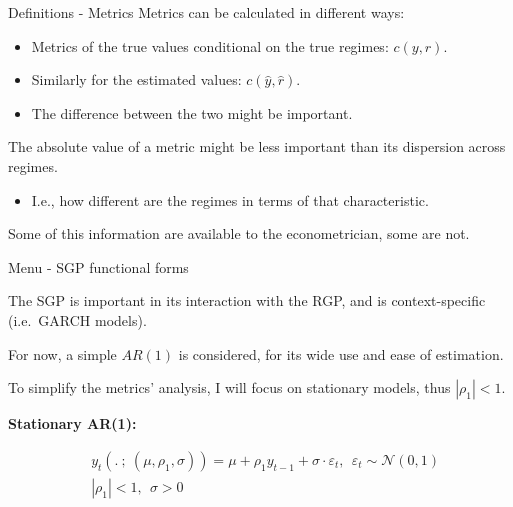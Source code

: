 \documentclass[
  ignorenonframetext,
]{beamer}
\providecommand{\tightlist}{%
  \setlength{\itemsep}{0pt}\setlength{\parskip}{0pt}}\usepackage{longtable,booktabs,array}
\begin{document}
\begin{frame}{Definitions - Metrics}
\label{definitions---metrics-1}
Metrics can be calculated in different ways:

\begin{itemize}
\tightlist
\item
  Metrics of the true values conditional on the true regimes:
  \(c(y, r)\).
\item
  Similarly for the estimated values: \(c(\hat{y}, \hat{r})\).
\item
  The difference between the two might be important.
\end{itemize}

The absolute value of a metric might be less important than its
dispersion across regimes.

\begin{itemize}
\tightlist
\item
  I.e., how different are the regimes in terms of that characteristic.
\end{itemize}

Some of this information are available to the econometrician, some are
not.
\end{frame}

\begin{frame}{Menu - SGP functional forms}
\label{menu---sgp-functional-forms}

The SGP is important in its interaction with the RGP, and is
context-specific (i.e.~GARCH models).

For now, a simple \(AR(1)\) is considered, for its wide use and ease of
estimation.

To simplify the metrics' analysis, I will focus on stationary models,
thus \(|\rho_1| < 1\).

\textbf{Stationary AR(1):}

\begin{equation}
\begin{array}{ll}
    &y_t(. ~;~ (\mu, \rho_1, \sigma)) = \mu + \rho_1 y_{t-1} + \sigma \cdot \varepsilon_t, ~~ \varepsilon_t \sim \mathcal{N}(0, 1)\\
    &|\rho_1| < 1, ~~ \sigma > 0
\end{array} \tag{SGP-AR(1)}
\end{equation}
\end{frame}
\end{document}
